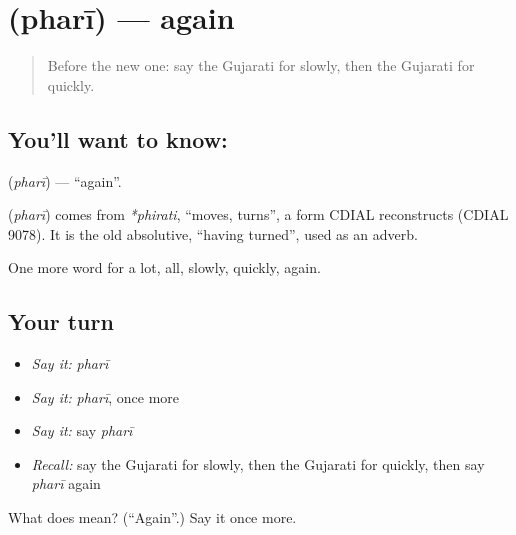 \section[\texorpdfstring{\gu{ફરી} (pharī)}{ફરી (pharī)}]{ (pharī) — again}

\label{lesson:GU-C76-again}



\begin{quote}
Before the new one: say the Gujarati for slowly, then the Gujarati for quickly.
\end{quote}

\subsection*{You'll want to know: }
\textbf{} (\emph{pharī}) — \textquotedblleft{}again\textquotedblright{}.

\begin{cousinweb}
\textbf{} (\emph{pharī}) comes from \emph{*phirati}, \textquotedblleft{}moves, turns\textquotedblright{}, a form CDIAL reconstructs (CDIAL 9078). It is the old absolutive, \textquotedblleft{}having turned\textquotedblright{}, used as an adverb.
\end{cousinweb}

\begin{grammarlens}[title={What you've built}]
One more word for a lot, all, slowly, quickly, again.
\end{grammarlens}

\subsection*{Your turn}
\begin{itemize}
\raggedright
  \item \emph{Say it:} \emph{pharī}
  \item \emph{Say it:} \emph{pharī}, once more
  \item \emph{Say it:} say \emph{pharī}
  \item \emph{Recall:} say the Gujarati for slowly, then the Gujarati for quickly, then say \emph{pharī} again
\end{itemize}

\begin{tcolorbox}[breakable,colback=teal!4,colframe=teal!35!black,title={Before you move on}]
What does  mean? (\textquotedblleft{}Again\textquotedblright{}.) Say it once more.
\end{tcolorbox}
